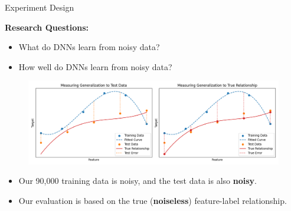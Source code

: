 \documentclass[9pt,handout]{beamer}
\begin{document}
\begin{frame}{Experiment Design}

    \textbf{Research Questions:}
    \begin{itemize}
        \item What do DNNs learn from noisy data?
        \item How well do DNNs learn from noisy data?
    \end{itemize}

    \begin{figure}[H]
        \includegraphics[width=\textwidth]{../project2/figures/datasets.png}
    \end{figure}

    \begin{itemize}
        \item Our 90,000 training data is noisy, and the test data is also \textbf{noisy}.
        \item Our evaluation is based on the true (\textbf{noiseless}) feature-label relationship\footnotemark.
    \end{itemize}


\end{frame}
\end{document}
